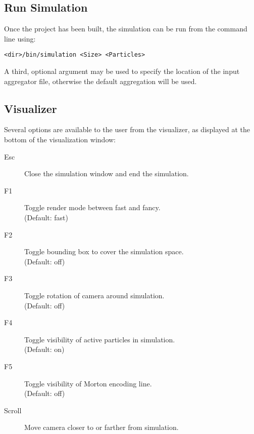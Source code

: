 \documentclass[fleqn,10pt]{UserGuideArx} %
\begin{document}
\subsection{Run Simulation}
Once the project has been built, the simulation can be run from the command line using:
\begin{center}
    \texttt{<dir>/bin/simulation <Size> <Particles>}
\end{center}
A third, optional argument may be used to specify the location of the input aggregator file, otherwise the default aggregation will be used.
\subsection{Visualizer}
Several options are available to the user from the visualizer, as displayed at the bottom of the visualization window:
\begin{description}
    \item[Esc] Close the simulation window and end the simulation.
    \item[F1] Toggle render mode between fast and fancy.\\ (Default: fast)
    \item[F2] Toggle bounding box to cover the simulation space.\\ (Default: off)
    \item[F3] Toggle rotation of camera around simulation.\\ (Default: off)
    \item[F4] Toggle visibility of active particles in simulation.\\ (Default: on)
    \item[F5] Toggle visibility of Morton encoding line.\\ (Default: off)
    \item[Scroll] Move camera closer to or farther from simulation.\\
\end{description}



% 
% 

\end{document}
